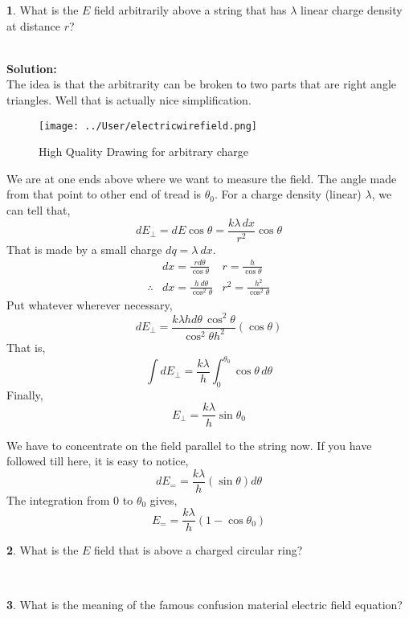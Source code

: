 \documentclass[a4paper]{article}
\theoremstyle{definition}
\newtheorem{prob}{ \framebox[0.09\textwidth]{{\sffamily Pr}} }
\newcommand{\pr}[1]{ \begin{tcolorbox} \begin{prob} 
    #1 
\end{prob} 
   \end{tcolorbox}\ 
   \\
 }
\begin{document}
\pr{What is the $E$ field arbitrarily above a string that has $\lambda$ linear charge density at distance $r$?}
\textbf{Solution:}\\ The idea is that the arbitrarity can be broken to two parts that are right angle triangles. Well that is actually nice simplification. 
\begin{figure}[hbtp]
\centering
\texttt{[image: ../User/electricwirefield.png]}
\caption{High Quality Drawing for arbitrary charge}
\end{figure}
We are at one ends above where we want to measure the field. The angle made from that point to other end of tread is $\theta _0$. For a charge density (linear) $\lambda$,
we can tell that, 
\[dE_{\perp} = dE \cos \theta = \frac{k \lambda \, dx}{r^2} \cos \theta \]
That is made by a small charge $dq = \lambda \ dx$. 
\begin{align*}
&dx = \frac{r d \theta}{\cos \theta}  
&r = \frac{h}{\cos \theta} \\
\therefore  &dx= \frac{h \, d\theta }{\cos ^2 \theta} 
&r^2 = \frac{h^2}{\cos ^2 \theta} 
\end{align*}
Put whatever wherever necessary, 
\[ dE_{\perp} = \frac{k \lambda h d \theta \, \cos ^2 \theta }{\cos ^2 \theta h^2} (\cos \theta) \]
That is, 
\[ \int dE_{\perp} = \frac{k \lambda}{h	} \int_{0}^{\theta _0} \cos \theta \, d \theta \]
Finally, 
\[ E_{\perp} = \frac{k \lambda}{h} \sin \theta _0 \]

We have to concentrate on the field parallel to the string now. If you have followed till here, it is easy to notice, 
\[ dE_{=} = \frac{k\lambda}{h} (\sin \theta) d \theta \]
The integration from $0$ to $\theta _0$ gives, 
\[E_{=} = \frac{k\lambda}{h} (1 - \cos \theta _0)\]
\begin{center}
\end{center}
\pr{What is the $E$ field that is above a charged circular ring?}
\pr{What is the meaning of the famous confusion material electric field equation?}
\end{document}
